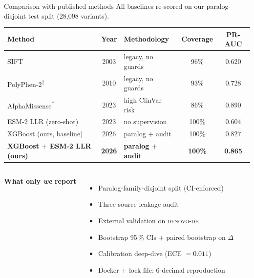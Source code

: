 \documentclass[aspectratio=169,10pt]{beamer}
\begin{document}

\begin{frame}{Comparison with published methods}
  \centering
  \scriptsize
  All baselines re-scored on our paralog-disjoint test split
  (28{,}098 variants).
  \vspace{0.4em}

  \begin{tabular}{@{}l c l c c@{}}
    \toprule
    \textbf{Method} & \textbf{Year} & \textbf{Methodology} &
    \textbf{Coverage} & \textbf{PR-AUC} \\
    \midrule
    SIFT                                 & 2003 & legacy, no guards     & 96\%  & 0.620 \\
    PolyPhen-2\textsuperscript{$\dagger$} & 2010 & legacy, no guards     & 93\%  & 0.728 \\
    AlphaMissense\textsuperscript{*}      & 2023 & high ClinVar risk    & 86\%  & 0.890 \\
    ESM-2 LLR (zero-shot)                & 2023 & no supervision        & 100\% & 0.604 \\
    \midrule
    XGBoost (ours, baseline)             & 2026 & paralog $+$ audit     & 100\% & 0.827 \\
    \rowcolor{kkuGoldLight}
    \textbf{XGBoost $+$ ESM-2 LLR (ours)} & \textbf{2026} &
    \textbf{paralog $+$ audit} & \textbf{100\%} & \textbf{0.865} \\
    \bottomrule
  \end{tabular}

  \vspace{0.5em}
  \begin{columns}[T]
    \textbf{\textcolor{kkuGreen}{What only \emph{we} report}}
    \begin{itemize}\setlength{\itemsep}{0.04em}
      \item Paralog-family-disjoint split (CI-enforced)
      \item Three-source leakage audit
      \item External validation on \textsc{denovo-db}
      \item Bootstrap 95\,\% CIs + paired bootstrap on $\Delta$
      \item Calibration deep-dive (ECE $=0.011$)
      \item Docker + lock file: 6-decimal reproduction
    \end{itemize}


\end{columns}
\end{frame}
\end{document}
